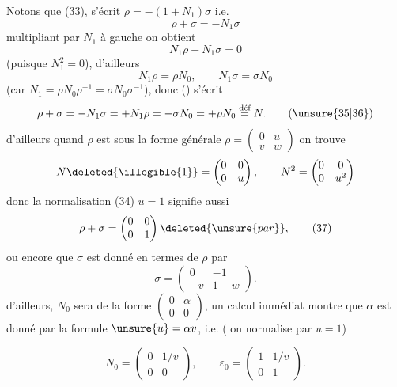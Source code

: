 
Notons que (33), s'écrit $\rho=-(1+N_1)\sigma$ i.e.
\[
\rho+\sigma=-N_1\sigma \tag{35}
\]
multipliant par $N_1$ à gauche on obtient
\[
N_1\rho+N_1\sigma=0
\]
(puisque $N_1^2=0$), d'ailleurs
\[
N_1\rho=\rho N_0,\qquad N_1\sigma=\sigma N_0
\]
(car $N_1=\rho N_0\rho^{-1}=\sigma N_0\sigma^{-1}$), donc () s'écrit
\[
\rho+\sigma=-N_1\sigma=+N_1\rho=-\sigma N_0=+\rho N_0
\overset{\text{déf}}{=}N . \tag{\unsure{35|36}}
\]
d'ailleurs quand $\rho$ est sous la forme générale
$\rho=\begin{pmatrix}0&u\\v&w\end{pmatrix}$ on trouve
\[
N\deleted{\illegible{1}}=\begin{pmatrix}0&0\\0&u\end{pmatrix},
\qquad N^2=\begin{pmatrix}0&0\\0&u^2\end{pmatrix}
\]
donc la normalisation (34) $u=1$ signifie aussi
\[
\rho+\sigma=\begin{pmatrix}0&0\\0&1\end{pmatrix}\deleted{\unsure{par}}, \tag{37}
\]
ou encore que $\sigma$ est donné en termes de $\rho$ par
\[
\sigma=\begin{pmatrix}0&-1\\-v&1-w\end{pmatrix}. \tag{38}
\]
d'ailleurs, $N_0$  sera de la forme
$\begin{pmatrix}0&\alpha\\0&0\end{pmatrix}$,
un calcul immédiat montre que $\alpha$ est donné par la formule
$\unsure{u}=\alpha v$, i.e. ( on normalise par $u=1$)



\[
N_0=\begin{pmatrix}0&1/v\\0&0\end{pmatrix},\qquad
\varepsilon_0=\begin{pmatrix}1&1/v\\0&1\end{pmatrix}. \tag{39}
\]

